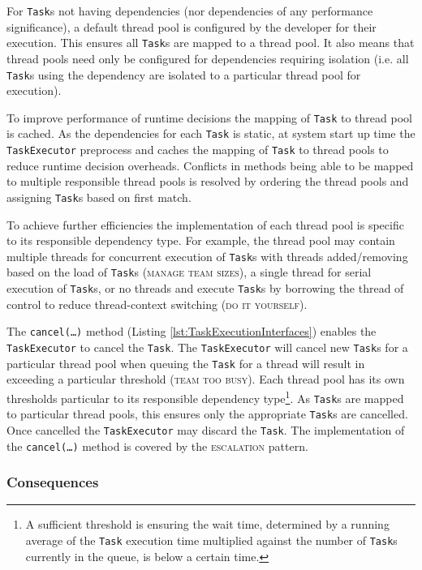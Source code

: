 \documentclass[prodmode]{style/acmlarge}
\begin{document}
For \texttt{Task}s not having dependencies (nor dependencies of any performance
significance), a default thread pool is configured by the developer for their
execution.  This ensures all \texttt{Task}s are mapped to a thread pool.  It
also means that thread pools need only be configured for dependencies requiring
isolation (i.e. all \texttt{Task}s using the dependency are isolated to a
particular thread pool for execution).

To improve performance of runtime decisions the mapping of \texttt{Task} to
thread pool is cached.  As the dependencies for each \texttt{Task} is static, at
system start up time the \texttt{TaskExecutor} preprocess and caches the mapping
of \texttt{Task} to thread pools to reduce runtime decision overheads. 
Conflicts in methods being able to be mapped to multiple responsible thread
pools is resolved by ordering the thread pools and assigning \texttt{Task}s
based on first match.

To achieve further efficiencies the implementation of each thread pool is
specific to its responsible dependency type.  For example, the thread pool may
contain multiple threads for concurrent execution of \texttt{Task}s with threads
added/removing based on the load of \texttt{Task}s (\textsc{manage team sizes}),
a single thread for serial execution of \texttt{Task}s, or no threads and
execute \texttt{Task}s by borrowing the thread of control to reduce
thread-context switching (\textsc{do it yourself}).

The \texttt{cancel(\ldots)} method (Listing \ref{lst:TaskExecutionInterfaces})
enables the \texttt{TaskExecutor} to cancel the \texttt{Task}. The
\texttt{Task\-Executor} will cancel new \texttt{Task}s for a particular thread
pool when queuing the \texttt{Task} for a thread will result in exceeding a
particular threshold (\textsc{team too busy}).  Each thread pool has its own
thresholds particular to its responsible dependency type\footnote{A sufficient
threshold is ensuring the wait time, determined by a running average of the
\texttt{Task} execution time multiplied against the number of \texttt{Task}s
currently in the queue, is below a certain time.}.  As \texttt{Task}s are mapped
to particular thread pools, this ensures only the appropriate \texttt{Task}s are
cancelled.  Once cancelled the \texttt{TaskExecutor} may discard the
\texttt{Task}.  The implementation of the \texttt{can\-cel(\ldots)} method is
covered by the \textsc{escalation} pattern.


\subsubsection*{Consequences}
\end{document}
